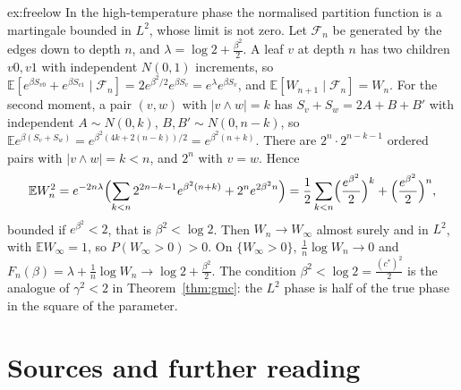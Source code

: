 \begin{solution}{ex:freelow}
\idea In the high-temperature phase the normalised partition function is a martingale bounded in $L^2$, whose limit is not zero.
\writeup Let $\mathcal F_n$ be generated by the edges down to depth $n$, and $\lambda=\log2+\frac{\beta^2}2$. A leaf $v$ at depth $n$ has two children $v0,v1$ with independent $N(0,1)$ increments, so
$\mathbb E[e^{\beta S_{v0}}+e^{\beta S_{v1}}\mid\mathcal F_n]=2e^{\beta^2/2}e^{\beta S_v}=e^\lambda e^{\beta S_v}$, and $\mathbb E[W_{n+1}\mid\mathcal F_n]=W_n$. For the second moment, a pair $(v,w)$ with $|v\wedge w|=k$ has $S_v+S_w=2A+B+B'$ with independent $A\sim N(0,k)$, $B,B'\sim N(0,n-k)$, so
$\mathbb Ee^{\beta(S_v+S_w)}=e^{\beta^2(4k+2(n-k))/2}=e^{\beta^2(n+k)}$. There are $2^n\cdot2^{n-k-1}$ ordered pairs with $|v\wedge w|=k<n$, and $2^n$ with $v=w$. Hence
\[
\mathbb EW_n^2=e^{-2n\lambda}\Bigl(\sum_{k<n}2^{2n-k-1}e^{\beta^2(n+k)}+2^ne^{2\beta^2n}\Bigr)=\frac12\sum_{k<n}\Bigl(\frac{e^{\beta^2}}2\Bigr)^k+\Bigl(\frac{e^{\beta^2}}2\Bigr)^n,
\]
bounded if $e^{\beta^2}<2$, that is $\beta^2<\log2$. Then $W_n\to W_\infty$ almost surely and in $L^2$, with $\mathbb EW_\infty=1$, so $P(W_\infty>0)>0$. On $\{W_\infty>0\}$, $\frac1n\log W_n\to0$ and $F_n(\beta)=\lambda+\frac1n\log W_n\to\log2+\frac{\beta^2}2$. The condition
$\beta^2<\log2=\frac{(c^*)^2}2$ is the analogue of $\gamma^2<2$ in Theorem~\ref{thm:gmc}: the $L^2$ phase is half of the true phase in the square of the parameter.
\end{solution}

\section*{Sources and further reading}

